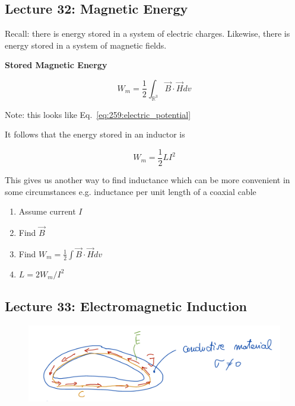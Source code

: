 \documentclass[10pt]{article}
\begin{document}
\subsection{Lecture 32: Magnetic Energy}

\begin{blockquote}
	Recall: there is energy stored in a system of electric charges. 
	Likewise, there is energy stored in a system of magnetic fields.
\end{blockquote}


\begin{definition}
	\textbf{Stored Magnetic Energy} 

	\begin{equation}
		W_m = \frac{1}{2} \int_{\mathbb{R}^3} \vec{B} \cdot \vec{H} d v
		\label{eq:259:magnetic_potential}
	\end{equation}

	Note: this looks like Eq.~\ref{eq:259:electric_potential}

	It follows  that the energy stored in an inductor is

	\begin{equation}
		W_m = \frac{1}{2} LI^2
		\label{eq:259:magnetic_potential_inductor}
	\end{equation}
\end{definition}

This gives us another way to find inductance which can be more convenient in some circumstances e.g. inductance per unit length of a coaxial cable

\begin{enumerate}
	\item Assume current $ I $ 
	\item Find $ \vec{B} $
	\item Find $ W_m = \frac{1}{2} \int \vec{B}\cdot  \vec{H} dv  $ 
	\item $ L  =  2W_m/I^2 $
\end{enumerate}

\subsection{Lecture 33: Electromagnetic Induction}
\begin{figure}[H]
	\centering
	\includegraphics[width=0.8\linewidth]{img/image_2022-04-17-18-58-24.png}
\end{figure}
\end{document}
